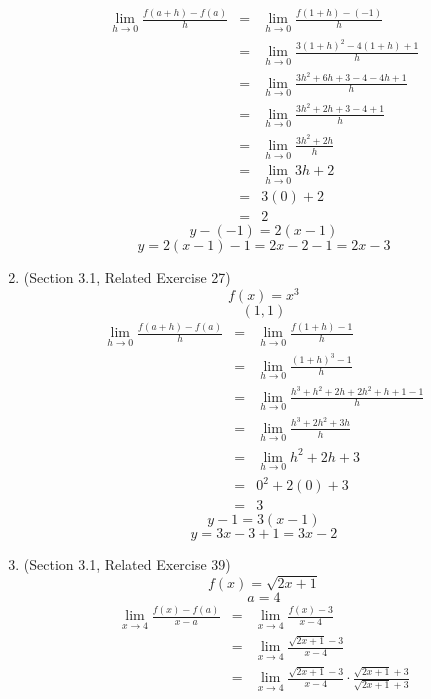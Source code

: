 \documentclass{article}
\begin{document}
\begin{enumerate}
\begin{eqnarray}
        \lim_{h \to 0}{\frac{f(a + h) - f(a)}{h}} &=& \lim_{h \to 0}{\frac{f(1 + h) - (-1)}{h}} \\
                                                &=& \lim_{h \to 0}{\frac{3(1 + h)^2 - 4(1 + h) +1}{h}} \\
                                                &=& \lim_{h \to 0}{\frac{3h^2 + 6h + 3 - 4 - 4h +1}{h}} \\
                                                &=& \lim_{h \to 0}{\frac{3h^2 + 2h + 3 - 4 + 1}{h}} \\
                                                &=& \lim_{h \to 0}{\frac{3h^2 + 2h}{h}} \\
                                                &=& \lim_{h \to 0}{3h + 2} \\
                                                &=& 3(0) + 2 \\
                                                &=& 2
    \end{eqnarray}
    $$y - (-1) = 2(x - 1)$$
    $$y = 2(x - 1) - 1 = 2x - 2 - 1 = 2x - 3$$
    \item (Section 3.1, Related Exercise 27)
    $$f(x) = x^3$$
    $$(1, 1)$$
    \begin{eqnarray}
        \lim_{h \to 0}{\frac{f(a + h) - f(a)}{h}} &=& \lim_{h \to 0}{\frac{f(1 + h) - 1}{h}} \\
        &=& \lim_{h \to 0}{\frac{(1 + h)^3 - 1}{h}} \\
        &=& \lim_{h \to 0}{\frac{h^3 + h^2 + 2h + 2h^2 + h + 1 - 1}{h}} \\
        &=& \lim_{h \to 0}{\frac{h^3 + 2h^2 + 3h}{h}} \\
        &=& \lim_{h \to 0}{h^2 + 2h + 3} \\
        &=& 0^2 + 2(0) + 3 \\
        &=& 3
    \end{eqnarray}
    $$y - 1 = 3(x - 1)$$
    $$y = 3x - 3 + 1 = 3x - 2$$
    \item (Section 3.1, Related Exercise 39)
    $$f(x) = \sqrt{2x+1}$$
    $$a = 4$$
    \begin{eqnarray}
        \lim_{x \to 4}{\frac{f(x) - f(a)}{x - a}} &=& \lim_{x \to 4}{\frac{f(x) - 3}{x - 4}} \\
                                                &=& \lim_{x \to 4}{\frac{\sqrt{2x + 1} - 3}{x - 4}} \\
                                                &=& \lim_{x \to 4}{\frac{\sqrt{2x + 1} - 3}{x - 4} \cdot \frac{\sqrt{2x + 1} + 3}{\sqrt{2x + 1} + 3}} \\

\end{eqnarray}
\end{enumerate}
\end{document}

